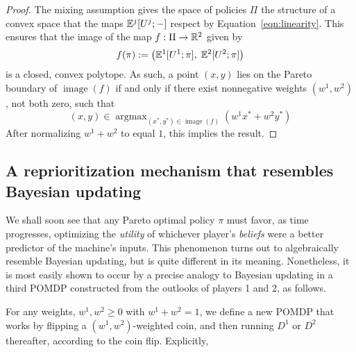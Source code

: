 \documentclass{article}  %
\newcommand{\eqn}[1]{Equation~\ref{eqn:#1}}
\DeclareMathOperator*{\argmax}{argmax}
\DeclareMathOperator{\image}{image}
\begin{document}
\begin{proof}
The mixing assumption gives the space of policies $\Pi$ the structure of a convex space that the maps $\mathbb{E}^j[U^j; -] $ respect by \eqn{linearity}.  This ensures that the image of the map $f:\Pi\to\mathbb{R}^2$ given by
\[
f(\pi) := \left(\mathbb{E}^1[U^1;\pi],\; \mathbb{E}^2[U^2;\pi]\right)
\]
is a closed, convex polytope.  As such, a point $(x,y)$ lies on the Pareto boundary of $\image(f)$ if and only if there exist nonnegative weights $(w^1,w^2)$, not both zero, such that 
\[
(x,y) \in \argmax_{(x^*,y^*)\in \image(f)} \left(w^1x^* + w^2y^*\right)
\]
After normalizing $w^1+w^2$ to equal $1$, this implies the result.
\end{proof}

\subsection{A reprioritization mechanism that resembles Bayesian updating}

We shall soon see that any Pareto optimal policy $\pi$ must favor, as time progresses, optimizing the \emph{utility} of whichever player's \emph{beliefs} were a better predictor of the machine's inputs.  This phenomenon turns out to algebraically resemble Bayesian updating, but is quite different in its meaning.  Nonetheless, it is most easily shown to occur by a precise analogy to Bayesian updating in a third POMDP constructed from the outlooks of players 1 and 2, as follows.

For any weights, $w^1,w^2\ge 0$ with $w^1+w^2=1$, we define a new POMDP that works by flipping a $(w^1,w^2)$-weighted coin, and then running $D^1$ or $D^2$ thereafter, according to the coin flip.  Explicitly, 
\end{document}
